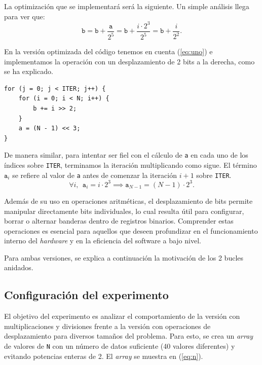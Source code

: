 \documentclass[11pt,a4paper,twoside]{article}
\theoremstyle{definition}
\begin{document}
	La optimización que se implementará será la siguiente. Un simple análisis llega para ver que:
	\begin{equation}\label{eq:uno}
		\texttt{b} = \texttt{b} + \dfrac{\texttt{a}}{2^5} = \texttt{b} + \dfrac{i \cdot 2^3}{2^5} = \texttt{b} + \dfrac{i}{2^2}.
	\end{equation}
	
	En la versión optimizada del código tenemos en cuenta (\ref{eq:uno}) e implementamos la operación con un desplazamiento de 2 bits a la derecha, como se ha explicado.
	\begin{verbatim}
for (j = 0; j < ITER; j++) {
	for (i = 0; i < N; i++) {
		b += i >> 2;
	}
	a = (N - 1) << 3;
}
	\end{verbatim}

	De manera similar, para intentar ser fiel con el cálculo de \texttt{a} en cada uno de los índices sobre \texttt{ITER}, terminamos la iteración multiplicando como sigue. El término $\texttt{a}_i$ se refiere al valor de \texttt{a} antes de comenzar la iteración $i+1$ sobre \texttt{ITER}.
	\begin{equation}\label{eq:dos}
		\forall i, \:\: \texttt{a}_i = i \cdot 2^3 \implies \texttt{a}_{N-1} = (N-1)\cdot 2^3.
	\end{equation}
	
	Además de su uso en operaciones aritméticas, el desplazamiento de bits permite manipular directamente bits individuales, lo cual resulta útil para configurar, borrar o alternar banderas dentro de registros binarios. Comprender estas operaciones es esencial para aquellos que deseen profundizar en el funcionamiento interno del \textit{hardware} y en la eficiencia del software a bajo nivel.
	
	Para ambas versiones, se explica a continuación la motivación de los 2 bucles anidados.
	
	\subsection{Configuración del experimento}
	
	El objetivo del experimento es analizar el comportamiento de la versión con multiplicaciones y divisiones frente a la versión con operaciones de desplazamiento para diversos tamaños del problema. Para esto, se crea un \textit{array} de valores de \texttt{N} con un número de datos suficiente (40 valores diferentes) y evitando potencias enteras de 2. El \textit{array} se muestra en (\ref{eq:n}).
	
\end{document}
